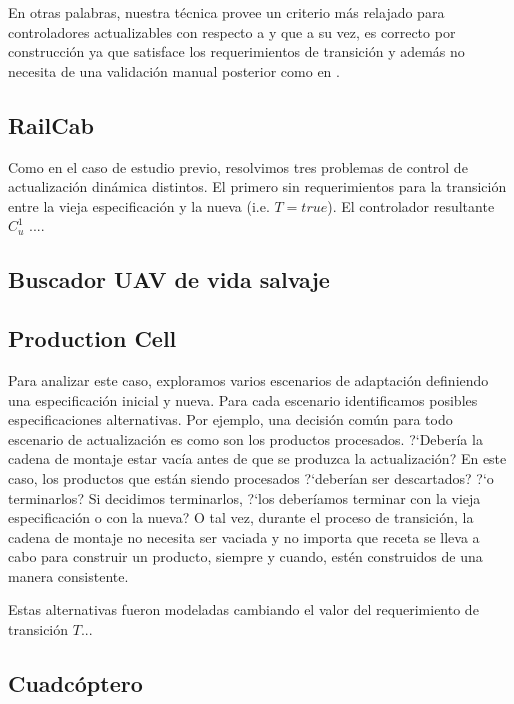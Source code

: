 En otras palabras, nuestra técnica provee un criterio más relajado para controladores actualizables con respecto a
\cite{6224401} y que a su vez, es correcto por construcción ya que satisface los requerimientos de transición y además
no necesita de una validación manual posterior como en \cite{PanzicaLaManna:2013:FCC:2487336.2487349}.


\subsection{RailCab}

Como en el caso de estudio previo, resolvimos tres problemas de control de actualización dinámica distintos. El primero
sin requerimientos para la transición entre la vieja especificación y la nueva (i.e. $T = true$). El controlador
resultante $C^1_u$ ....

\subsection{Buscador UAV de vida salvaje}

\subsection{Production Cell}

Para analizar este caso, exploramos varios escenarios de adaptación definiendo una especificación inicial y nueva. Para
cada escenario identificamos posibles especificaciones alternativas. Por ejemplo, una decisión común para todo escenario
de actualización es como son los productos procesados. ?`Debería la cadena de montaje estar vacía antes de que se
produzca la actualización? En este caso, los productos que están siendo procesados ?`deberían ser descartados? ?`o
terminarlos? Si decidimos terminarlos, ?`los deberíamos terminar con la vieja especificación o con la nueva? O tal vez,
durante el proceso de transición, la cadena de montaje no necesita ser vaciada y no importa que receta se lleva a cabo
para  construir un producto, siempre y cuando, estén construidos de una manera consistente. 

Estas alternativas fueron modeladas cambiando el valor del requerimiento de transición $T$...

\subsection{Cuadcóptero}

